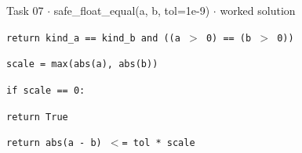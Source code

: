 \documentclass[11pt]{article}
\begin{document}
\begin{keepsection}
\begin{workedbox}{Task 07 \ensuremath{\cdot} safe\_float\_equal(a, b, tol=1e-9) \ensuremath{\cdot} worked solution}
\begin{enumerate}
\begin{tcolorbox}[colback=Paperblue,colframe=Paperblue,boxrule=0pt,arc=0pt,left=7pt,right=7pt,top=5pt,bottom=5pt]
\noindent\hspace*{3em}\texttt{return kind\_a == kind\_b and ((a \ensuremath{>} 0) == (b \ensuremath{>} 0))}\par
\noindent\hspace*{1em}\texttt{scale = max(abs(a), abs(b))}\par
\noindent\hspace*{1em}\texttt{if scale == 0:}\par
\noindent\hspace*{3em}\texttt{return True}\par
\noindent\hspace*{1em}\texttt{return abs(a - b) \ensuremath{<}= tol * scale}\par
\end{tcolorbox}
\end{enumerate}
\end{workedbox}

\end{keepsection}
\end{document}
